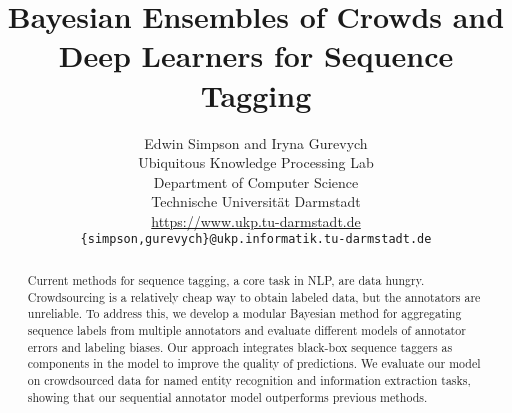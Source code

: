 \documentclass[11pt,a4paper]{article}
\title{Bayesian Ensembles of Crowds and Deep Learners for Sequence Tagging}%
\author{Edwin Simpson and Iryna Gurevych\\
  Ubiquitous Knowledge Processing Lab \\
  Department of Computer Science \\
  Technische Universit\"at Darmstadt \\
  \url{https://www.ukp.tu-darmstadt.de} \\
  {\tt \{simpson,gurevych\}@ukp.informatik.tu-darmstadt.de}
}
\begin{document}
\maketitle


\begin{abstract}
Current methods for sequence tagging, a core task in NLP, are data hungry.
Crowdsourcing is a relatively cheap way to obtain labeled data, but
the annotators are unreliable.
To address this, we develop
 a modular Bayesian method for aggregating sequence labels from multiple annotators
 and evaluate different models of annotator errors and labeling biases.
Our approach integrates 
black-box sequence taggers as components in the model
to improve the quality of predictions.
We evaluate our model on crowdsourced data for named entity recognition and information extraction tasks,
showing that our sequential annotator model outperforms previous methods.
\end{abstract}











%
% 


\end{document}
